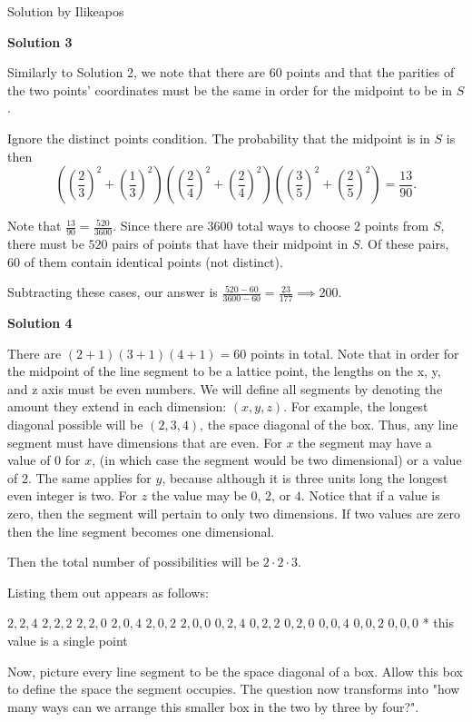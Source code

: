 \begin{enumerate}
 Solution by Ilikeapos

 



\textbf{Solution 3}

Similarly to Solution 2, we note that there are $60$ points and that the parities of the two points' coordinates must be the same in order for the midpoint to be in $S$.

 Ignore the distinct points condition. The probability that the midpoint is in $S$ is then
 \[\left(\left(\frac 23\right)^2+\left(\frac 13\right)^2\right)\left(\left(\frac 24\right)^2+\left(\frac 24\right)^2\right)\left(\left(\frac 35\right)^2+\left(\frac 25\right)^2\right)=\frac{13}{90}.\]

 Note that $\frac{13}{90}=\frac{520}{3600}$. Since there are $3600$ total ways to choose $2$ points from $S$, there must be $520$ pairs of points that have their midpoint in $S$. Of these pairs, $60$ of them contain identical points (not distinct).

 Subtracting these cases, our answer is $\frac{520-60}{3600-60}=\frac{23}{177}\implies\boxed{200}$.

 



\textbf{Solution 4}

There are $(2 + 1)(3 + 1)(4 + 1) = 60$ points in total. Note that in order for the midpoint of the line segment to be a lattice point, the lengths on the x, y, and z axis must be even numbers. We will define all segments by denoting the amount they extend in each dimension: $(x, y, z)$. For example, the longest diagonal possible will be $(2,3,4)$, the space diagonal of the box. Thus, any line segment must have dimensions that are even. For $x$ the segment may have a value of $0$ for $x$, (in which case the segment would be two dimensional) or a value of $2$. The same applies for $y$, because although it is three units long the longest even integer is two. For $z$ the value may be $0$, $2$, or $4$. Notice that if a value is zero, then the segment will pertain to only two dimensions. If two values are zero then the line segment becomes one dimensional. 

 Then the total number of possibilities will be $2 \cdot 2 \cdot 3$.

 Listing them out appears as follows:

 $2,2,4$
$2,2,2$
$2,2,0$
$2,0,4$
$2,0,2$
$2,0,0$
$0,2,4$
$0,2,2$
$0,2,0$
$0,0,4$
$0,0,2$
$0,0,0$ * this value is a single point

 
Now, picture every line segment to be the space diagonal of a box. Allow this box to define the space the segment occupies. The question now transforms into "how many ways can we arrange this smaller box in the two by three by four?".


\end{enumerate}
